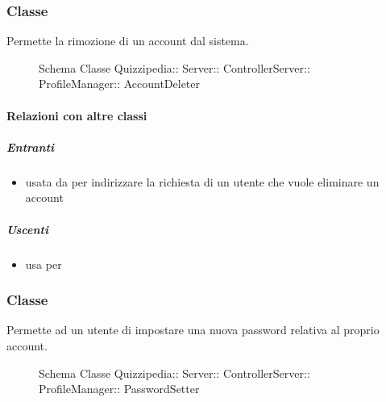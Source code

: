\subsubsection{Classe }
Permette la rimozione di un account dal sistema.
\begin{figure}[H]
\centering
\noindent{}
\caption[Schema Classe AccountDeleter]{Schema Classe Quizzipedia:: Server:: ControllerServer:: ProfileManager:: AccountDeleter}
\end{figure}
\paragraph{Relazioni con altre classi}
\subparagraph{Entranti}
\begin{itemize}
\item usata da  per indirizzare la richiesta di un utente che vuole eliminare un account
\end{itemize}
\subparagraph{Uscenti}
\begin{itemize}
\item usa  per 
\end{itemize}
\subsubsection{Classe }
Permette ad un utente di impostare una nuova password relativa al proprio account.
\begin{figure}[H]
\centering
\noindent{}
\caption[Schema Classe PasswordSetter]{Schema Classe Quizzipedia:: Server:: ControllerServer:: ProfileManager:: PasswordSetter}
\end{figure}
